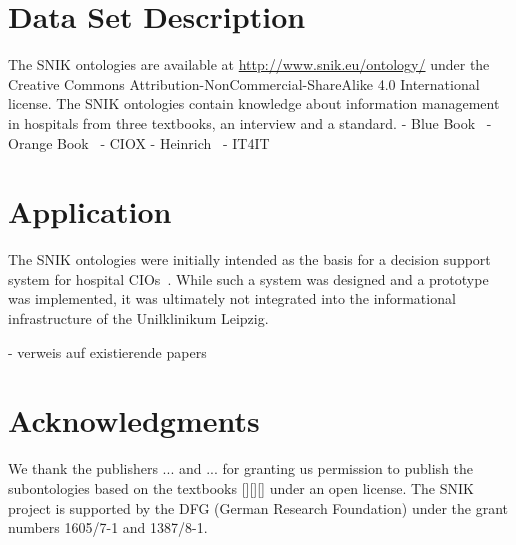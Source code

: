 \documentclass[sw]{iosart2x}
\begin{document}
\section{Data Set Description}\label{sec:dsd}
The SNIK ontologies are available at \url{http://www.snik.eu/ontology/} under the Creative Commons Attribution-NonCommercial-ShareAlike 4.0 International license.
The SNIK ontologies contain knowledge about information management in hospitals from three textbooks, an interview and a standard.
- Blue Book~\citep{bb}
- Orange Book~\citep{ob}
- CIOX
- Heinrich~\citep{he}
- IT4IT

\section{Application}\label{sec:application}
The SNIK ontologies were initially intended as the basis for a decision support system for hospital CIOs~\citep{domaene}.
While such a system was designed and a prototype was implemented, it was ultimately not integrated into the informational infrastructure of the Unilklinikum Leipzig.

- verweis auf existierende papers

\section{Acknowledgments}
We thank the publishers ... and ... for granting us permission to publish the subontologies based on the textbooks [][][] under an open license.
The SNIK project is supported by the DFG (German Research Foundation) under the grant numbers 1605/7-1 and 1387/8-1.
\nocite{*} 


\end{document}
